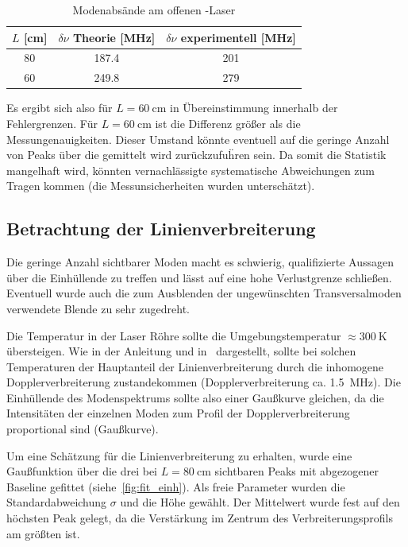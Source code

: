 \documentclass[slug=GL, room=HZDR\ Dresden/Rossendorf\,\ Geb.\ 620/123, supervisor=Tim\ Ziegler]{../../Lab_Report_LaTeX/lab_report}
\newcommand{\hne}{\ce{HeNe}-Laser}
\begin{document}
\begin{table}[H]
  \centering
  \begin{tabular}{SSS}
    \toprule
    {\(L\) [\si{\centi\meter}]} & {\(\delta\nu\) Theorie [\si{\mega\hertz}]} & {\(\delta\nu\) experimentell [\si{\mega\hertz}]}\\
     & 187.4 & 201 \\
    60 & 249.8 & 279 \\
    \bottomrule
  \end{tabular}
  \caption{Modenabs\"ande am offenen \hne{}}
  \label{tab:kaustik}
\end{table}

Es ergibt sich also f\"ur \(L=\SI{60}{\centi\meter}\) in
\"Ubereinstimmung innerhalb der Fehlergrenzen. F\"ur
\(L=\SI{60}{\centi\meter}\) ist die Differenz gr\"o\ss{}er als die
Messungenauigkeiten. Dieser Umstand k\"onnte eventuell auf die geringe
Anzahl von Peaks \"uber die gemittelt wird zur\"uckzufu\"hren sein. Da
somit die Statistik mangelhaft wird, k\"onnten vernachl\"assigte
systematische Abweichungen zum Tragen kommen (die Messunsicherheiten
wurden untersch\"atzt).

\subsection{Betrachtung der Linienverbreiterung}
\label{sec:linver}

Die geringe Anzahl sichtbarer Moden macht es schwierig, qualifizierte
Aussagen \"uber die Einh\"ullende zu treffen und l\"asst auf eine hohe Verlustgrenze
schlie\ss{}en. Eventuell wurde auch die zum Ausblenden der
ungew\"unschten Transversalmoden verwendete Blende zu sehr zugedreht.

Die Temperatur in der Laser R\"ohre sollte die Umgebungstemperatur
\(\approx \SI{300}{\kelvin}\) \"ubersteigen. Wie in der Anleitung und
in~\cite[60]{Sigrist2018} dargestellt, sollte bei solchen Temperaturen
der Hauptanteil der Linienverbreiterung durch die inhomogene
Dopplerverbreiterung zustandekommen (Dopplerverbreiterung
ca. \SI{1.5}{\mega\hertz}). Die Einh\"ullende des Modenspektrums
sollte also einer Gaußkurve gleichen, da die Intensit\"aten der
einzelnen Moden zum Profil der Dopplerverbreiterung proportional sind
(Gau\ss{}kurve).

Um eine Schätzung f\"ur die Linienverbreiterung zu erhalten, wurde
eine Gaußfunktion \"uber die drei bei \(L=\SI{80}{\centi\meter}\)
sichtbaren Peaks mit abgezogener Baseline gefittet
(siehe~\ref{fig:fit_einh}). Als freie Parameter wurden die
Standardabweichung \(\sigma\) und die H\"ohe gew\"ahlt. Der
Mittelwert wurde fest auf den h\"ochsten Peak gelegt, da die
Verst\"arkung im Zentrum des Verbreiterungsprofils am gr\"o\ss{}ten
ist.
\end{document}
